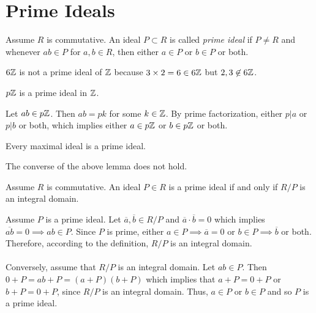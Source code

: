 \section{Prime Ideals}
\begin{definition}
    Assume $R$ is commutative. An ideal $P \subset R$ is called \textit{prime ideal} if $P \neq R$ and whenever $ab \in P$ for $a,b \in R$, then either $a \in P$ or $b \in P$ or both.
\end{definition}
\begin{noneg}
    $6\mathbb{Z}$ is not a prime ideal of $\mathbb{Z}$ because $3 \times 2 = 6 \in 6\mathbb{Z}$ but $2,3 \not \in 6\mathbb{Z}$.
\end{noneg}
\begin{lemma}
    $p\mathbb{Z}$ is a prime ideal in $\mathbb{Z}$.
\end{lemma}
\begin{explanation}
    Let $ab \in p\mathbb{Z}$. Then $ab = pk$ for some $k \in \mathbb{Z}$. By prime factorization, either $p \vert  a$ or $p \vert  b$ or both, which implies either $a \in p\mathbb{Z}$ or $b \in p\mathbb{Z}$ or both.
\end{explanation}
\begin{lemma}
    Every maximal ideal is a prime ideal.
\end{lemma}
The converse of the above lemma does not hold.
\begin{prop}
    Assume $R$ is commutative. An ideal $P \in R$ is a prime ideal if and only if $R/P$ is an integral domain.
\end{prop}
\begin{propproof}
    Assume $P$ is a prime ideal. Let $\overline{a}, \overline{b} \in R/P$ and $\overline{a} \cdot \overline{b} = 0$ which implies $\overline{ab} = 0 \implies ab \in P$.
    Since $P$ is prime, either $a \in P \implies \overline{a}=0$ or $b \in P \implies \overline{b}$ or both. Therefore, according to the definition, $R/P$ is an integral domain.\\\\
    Conversely, assume that $R/P$ is an integral domain. Let $ab \in P$. Then $0 + P = ab + P = (a+P)(b+P)$ which implies that $a+P = 0 +P$ or $b+P = 0 +P$, since $R/P$ is an integral domain. Thus, $a \in P$ or $b \in P$ and so $P$ is a prime ideal. 
\end{propproof}
